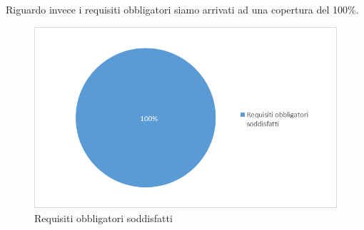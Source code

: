 Riguardo invece i requisiti obbligatori siamo arrivati ad una copertura del 100\%.
\begin{figure}[htbp]
   \begin{center}
    \includegraphics{immagini/requisiti_obbligatori.png}
    \caption{Requisiti obbligatori soddisfatti}
   \end{center}
\end{figure}    

